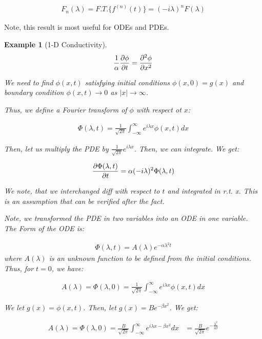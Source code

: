 \documentclass{article}
\newtheorem{ex}{Example}
\theoremstyle{definition}
\begin{document}
\begin{align}
F_n(\lambda) = F.T. \{f^{(n)}(t)\} = (-i\lambda)^n F(\lambda)
\end{align}

Note, this result is most useful for ODEs and PDEs.

\begin{ex}[1-D Conductivity]
\begin{align*}
\frac{1}{\alpha} \pdv{\phi}{t} = \pdv{ ^2 \phi}{x^2}
\end{align*}

We need to find $\phi(x,t)$ satisfying initial conditions $\phi(x,0) = g(x)$ and boundary condition $\phi(x,t) \to 0$ as $|x| \to \infty$. 

Thus, we define a Fourier transform of $\phi$ with respect ot $x$:

\begin{align*}
\Phi(\lambda, t) = \frac{1}{\sqrt{2 \pi}} \int_{-\infty}^{\infty}  e^{i\lambda x} \phi(x,t) dx
\end{align*}

Then, let us multiply the PDE by $\frac{1}{\sqrt{2 \pi}}  e^{i\lambda x}$. Then, we can integrate. We get:

\begin{align*}
\pdv{\Phi(\lambda, t)}{t} = \alpha (-i\lambda)^2\Phi(\lambda, t)
\end{align*}

We note, that we interchanged diff with respect to $t$ and integrated in r.t. x. This is an assumption that can be verified after the fact.

Note, we transformed the PDE in two variables into an ODE in one variable. The Form of the ODE is:

\begin{align*}
\Phi(\lambda, t) = A(\lambda) e^{-\alpha \lambda^2 t}
\end{align*}
where $A(\lambda)$ is an unknown function to be defined from the initial conditions. Thus, for $t=0$, we have:

\begin{align*}
A(\lambda) = \Phi(\lambda, 0) = \frac{1}{\sqrt{2 \pi}} \int_{-\infty}^{\infty}  e^{i\lambda x} \phi(x,t) dx
\end{align*}

We let $g(x) = \phi(x,t)$. Then, let $g(x) = B e^{-\beta x^2}$. We get:

\begin{align*}
A(\lambda) = \Phi(\lambda, 0) = \frac{B}{\sqrt{2 \pi}} \int_{-\infty}^{\infty}  e^{i\lambda x - \beta x^2} dx
&= \frac{B}{\sqrt{2 \pi}}  e^{-\frac{\lambda^2}{4\beta}}
\end{align*}


\end{ex}
\end{document}
